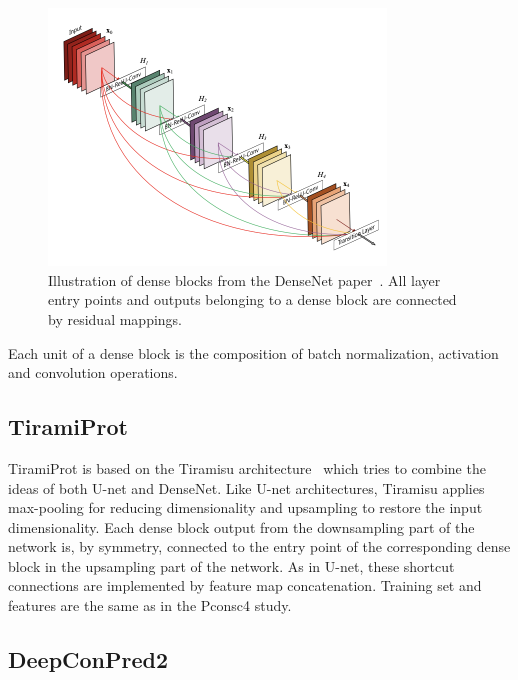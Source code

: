         \begin{figure}[H]
            \begin{center}
                \includegraphics[width=0.8\textwidth, keepaspectratio]{imgs/densenet.png}
                \caption{Illustration of dense blocks from the DenseNet paper~\cite{huang2017densely}.
                All layer entry points and outputs belonging to a dense block are connected
                by residual mappings.}
                \label{densenet}
            \end{center}
        \end{figure}

        Each unit of a dense block is the composition of batch normalization, activation and
        convolution operations.

    \subsection{TiramiProt}

        TiramiProt is based on the Tiramisu architecture~\cite{TsardakasRenhuldt1228846}
        which tries to combine the ideas of both U-net and DenseNet.
        Like U-net architectures, Tiramisu applies max-pooling for reducing dimensionality
        and upsampling to restore the input dimensionality. Each dense block output from
        the downsampling part of the network is, by symmetry, connected to the entry point
        of the corresponding dense block in the upsampling part of the network.
        As in U-net, these shortcut connections are implemented by feature map concatenation.
        Training set and features are the same as in the Pconsc4 study.

    \subsection{DeepConPred2}

